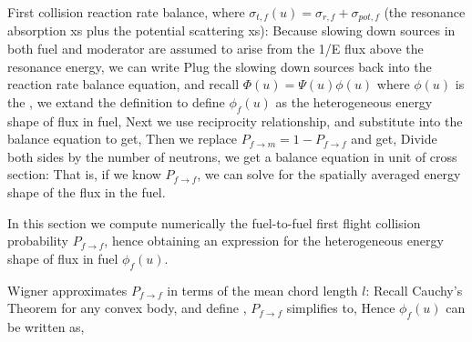 \documentclass{school-22.211-notes}
\begin{document}
First collision reaction rate balance, where $\sigma_{t,f}(u) = \sigma_{r,f} + \sigma_{pot, f}$ (the resonance absorption xs plus the potential scattering xs):
Because slowing down sources in both fuel and moderator are assumed to arise from the 1/E flux above the resonance energy, we can write
Plug the slowing down sources back into the reaction rate balance equation, and recall $\Phi(u) = \Psi(u) \phi(u)$ where $\phi(u)$ is the , we extand the definition to define $\phi_f(u)$ as the heterogeneous energy shape of flux in fuel,
Next we use reciprocity relationship,
and substitute into the balance equation to get,
Then we replace $P_{f\to m} = 1 - P_{f\to f}$ and get, 
Divide both sides by the number of neutrons, we get a balance equation in unit of cross section:
That is, if we know $P_{f\to f}$, we can solve for the spatially averaged energy shape of the flux in the fuel. 

In this section we compute numerically the fuel-to-fuel first flight collision probability $P_{f\to f}$, hence obtaining an expression for the heterogeneous energy shape of flux in fuel $\phi_f(u)$. 

Wigner approximates $P_{f\to f}$ in terms of the mean chord length $l$: 
Recall Cauchy's Theorem for any convex body, 
and define ,
$P_{f\to f}$ simplifies to, 
Hence $\phi_f(u)$ can be written as, 
\end{document}
